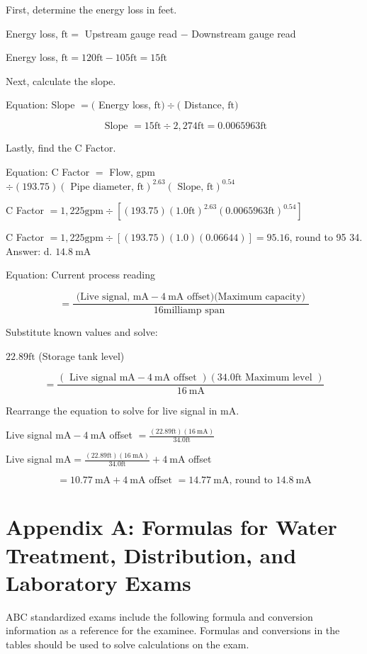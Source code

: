 \documentclass[10pt]{article}
\begin{document}
First, determine the energy loss in feet.

Energy loss, $\mathrm{ft}=$ Upstream gauge read $-$ Downstream gauge read

Energy loss, $\mathrm{ft}=120 \mathrm{ft}-105 \mathrm{ft}=15 \mathrm{ft}$

Next, calculate the slope.

Equation: Slope $=($ Energy loss, $\mathrm{ft}) \div($ Distance, $\mathrm{ft})$

$$
\text { Slope }=15 \mathrm{ft} \div 2,274 \mathrm{ft}=0.0065963 \mathrm{ft}
$$

Lastly, find the C Factor.

Equation: C Factor $=$ Flow, gpm $\div(193.75)(\text { Pipe diameter, } \mathrm{ft})^{2.63}(\text { Slope, } \mathrm{ft})^{0.54}$

C Factor $=1,225 \mathrm{gpm} \div\left[(193.75)(1.0 \mathrm{ft})^{2.63}(0.0065963 \mathrm{ft})^{0.54}\right]$

C Factor $=1,225 \mathrm{gpm} \div[(193.75)(1.0)(0.06644)]=95.16$, round to 95 34. Answer: d. $14.8 \mathrm{~mA}$

Equation: Current process reading

$$
=\frac{\text { (Live signal, } \mathrm{mA}-4 \mathrm{~mA} \text { offset)(Maximum capacity) }}{16 \mathrm{milliamp} \text { span }}
$$

Substitute known values and solve:

$22.89 \mathrm{ft}$ (Storage tank level)

$$
=\frac{(\text { Live signal } \mathrm{mA}-4 \mathrm{~mA} \text { offset })(34.0 \mathrm{ft} \text { Maximum level })}{16 \mathrm{~mA}}
$$

Rearrange the equation to solve for live signal in $\mathrm{mA}$.

Live signal $\mathrm{mA}-4 \mathrm{~mA}$ offset $=\frac{(22.89 \mathrm{ft})(16 \mathrm{~mA})}{34.0 \mathrm{ft}}$

Live signal $\mathrm{mA}=\frac{(22.89 \mathrm{ft})(16 \mathrm{~mA})}{34.0 \mathrm{ft}}+4 \mathrm{~mA}$ offset

$$
=10.77 \mathrm{~mA}+4 \mathrm{~mA} \text { offset }=14.77 \mathrm{~mA} \text {, round to } 14.8 \mathrm{~mA}
$$

\section{Appendix A: Formulas for Water Treatment, Distribution, and Laboratory Exams}
$\mathrm{ABC}$ standardized exams include the following formula and conversion information as a reference for the examinee. Formulas and conversions in the tables should be used to solve calculations on the exam.
\end{document}
